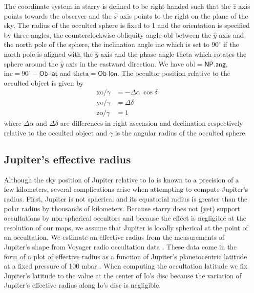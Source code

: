 \documentclass[modern]{aastex62}
\begin{document}
The coordinate system in \textsf{starry} is defined to be right handed such that the $\hat{z}$
axis points towards the observer and the $\hat{x}$ axis points to the right on the plane of the sky.
The radius of the occulted sphere is fixed to 1 and the orientation is specified by three angles,
the counterclockwise obliquity angle \textsf{obl} between the $\hat{y}$ axis and the north pole of the sphere, the inclination angle \textsf{inc} which is set to $90^\circ$ if the north pole is aligned with the $\hat{y}$ axis and the phase angle \textsf{theta} which rotates the sphere around the $\hat{y}$ axis in the eastward direction.
We have $\mathrm{obl}=\textsf{NP.ang}$, $\mathrm{inc}=90^\circ-\textsf{Ob-lat}$ and
$\mathrm{theta}=\textsf{Ob-lon}$.
The occultor position relative to the occulted object is given by
\begin{align}
    \mathrm{xo}/\gamma&=-\Delta\alpha\,\cos\delta\\
    \mathrm{yo}/\gamma&=\Delta\delta\\
    \mathrm{zo}/\gamma&=1
\end{align}
where $\Delta\alpha$ and $\Delta\delta$ are differences in right ascension and declination respectively relative to the occulted object and $\gamma$ is the angular radius of the occulted sphere.

\subsection{Jupiter's effective radius}
\label{ssec:effective_radius}
Although the sky position of Jupiter relative to Io is known to a precision of a few kilometers, several complications arise when attempting to compute Jupiter's radius.
First, Jupiter is not spherical and its equatorial radius is greater than the polar radius by thousands of kilometers. 
Because \textsf{starry} does not (yet) support occultations by non-spherical occultors and because the effect is negligible at the resolution of our maps, we assume that Jupiter is locally spherical at the point of an occultation. 
We estimate an effective radius from the measurements of Jupiter's shape from Voyager radio occultation data \citep{lindal1981}.
These data come in the form of a plot of effective radius  as a function of Jupiter's planetocentric latitude at a fixed pressure of 100 mbar \citep[Fig.~7 in ][]{lindal1981}.
When computing the occultation latitude we fix Jupiter's latitude to the value at the center of Io's disc because 
the variation of Jupiter's effective radius along Io's disc is negligible.
\end{document}
